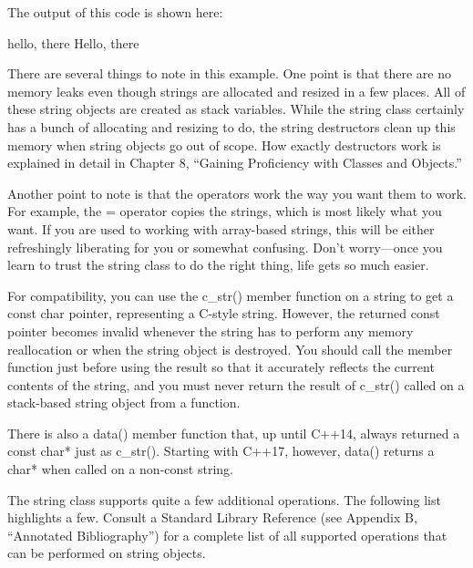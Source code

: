 The output of this code is shown here:

\begin{shell}
hello, there
Hello, there
\end{shell}

There are several things to note in this example. One point is that there are no memory leaks even though strings are allocated and resized in a few places. All of these string objects are created as stack variables. While the string class certainly has a bunch of allocating and resizing to do, the string destructors clean up this memory when string objects go out of scope. How exactly destructors work is explained in detail in Chapter 8, “Gaining Proficiency with Classes and Objects.”

Another point to note is that the operators work the way you want them to work. For example, the = operator copies the strings, which is most likely what you want. If you are used to working with array-based strings, this will be either refreshingly liberating for you or somewhat confusing. Don’t worry—once you learn to trust the string class to do the right thing, life gets so much easier.


For compatibility, you can use the c\_str() member function on a string to get a const char pointer, representing a C-style string. However, the returned const pointer becomes invalid whenever the string has to perform any memory reallocation or when the string object is destroyed. You should call the member function just before using the result so that it accurately reflects the current contents of the string, and you must never return the result of c\_str() called on a stack-based string object from a function.

There is also a data() member function that, up until C++14, always returned a const char* just as c\_str(). Starting with C++17, however, data() returns a char* when called on a non-const string.


The string class supports quite a few additional operations. The following list highlights a few. Consult a Standard Library Reference (see Appendix B, “Annotated Bibliography”) for a complete list of all supported operations that can be performed on string objects.


